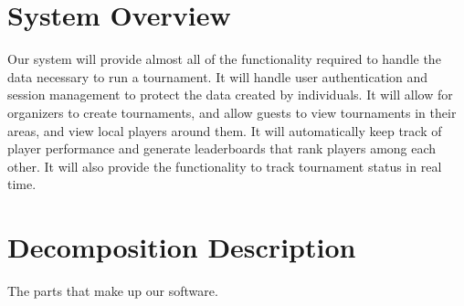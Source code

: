\documentclass{article}
\begin{document}
\pagebreak


\section{System Overview}
Our system will provide almost all of the functionality required to handle the data necessary to run a tournament. It will handle user authentication and session management to protect the data created by individuals. It will allow for organizers to create tournaments, and allow guests to view tournaments in their areas, and view local players around them. It will automatically keep track of player performance and generate leaderboards that rank players among each other. It will also provide the functionality to track tournament status in real time.

\section{Decomposition Description}
    
The parts that make up our software.
\end{document}
